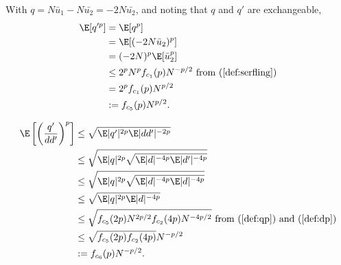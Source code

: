With $q = N\bar{u}_1 - N\bar{u_2} = -2N\bar{u_2}$, and noting that $q$ and $q'$ are
exchangeable,
\begin{align}
  \E[q'^p] 
  &= \E[q^p] \nonumber \\
  &= \E[(-2N\bar{u}_2)^p] \nonumber \\
  &= (-2N)^p \E[\bar{u}_2^p] \nonumber \\
  &\leq 2^pN^p f_{c_1}(p)N^{-p/2} \text{ from } (\ref{def:serfling})
  \nonumber \\
  &= 2^p f_{c_1}(p)N^{p/2} \nonumber \\
  &:= f_{c_5}(p) N^{p/2} \label{def:qp}.
\end{align}

\begin{align}
  \E \left [ \left ( \frac{q'}{dd'} \right )^p \right ]
  &\leq \sqrt{\E |q'|^{2p} \E |dd'|^{-2p}} \nonumber \\
  &\leq \sqrt{\E |q|^{2p} \sqrt{\E |d|^{-4p} \E |d'|^{-4p}}} \nonumber \\
  &\leq \sqrt{\E |q|^{2p} \sqrt{\E |d|^{-4p} \E |d|^{-4p}}} \nonumber \\
  &\leq \sqrt{\E |q|^{2p} \E |d|^{-4p}} \nonumber \\ 
  &\leq \sqrt{f_{c_5}(2p) N^{2p/2} f_{c_2}(4p) N^{-4p/2}} \text{ from
  } (\ref{def:qp}) \text{ and } (\ref{def:dp}) \nonumber \\
  &\leq \sqrt{f_{c_5}(2p) f_{c_2}(4p)} N^{-p/2} \nonumber \\
  &:= f_{c_6}(p) N^{-p/2} \label{def:qpddp}.
\end{align}